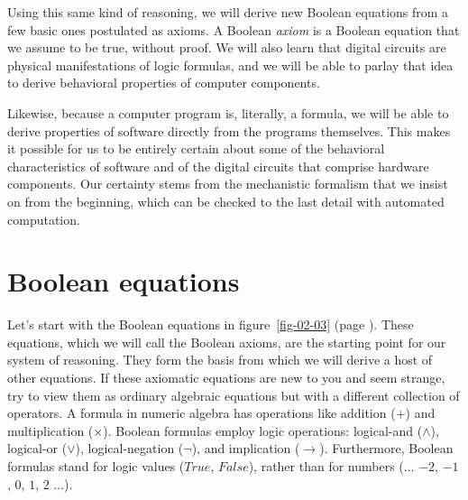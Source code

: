 Using this same kind of reasoning, we will derive new Boolean equations
from a few basic ones postulated as axioms.
A Boolean \emph{axiom} is a Boolean equation
that we assume to be true, without proof.
We will also learn that digital circuits are physical
manifestations of logic formulas, and we will be able to
parlay that idea to derive behavioral properties of
computer components.

Likewise, because a computer program is,
literally, a formula, we will be able to derive
properties of software directly from the programs themselves.
This makes it possible for us to be entirely
certain about some of the behavioral characteristics of
software and of the digital circuits that
comprise hardware components.
Our certainty stems from the mechanistic
formalism that we insist on from the beginning,
which can be checked to the last detail with automated computation.

\begin{exercises}
\label{ex:ch02-intro}


\end{exercises}

\section{Boolean equations}
\label{sec:boolean-equations}
Let's start with the Boolean equations in
figure~\ref{fig-02-03} (page \pageref{fig-02-03}).
These equations, which we will call the
Boolean axioms,
are the starting point for our system of reasoning.
They form the basis from which we will derive
a host of other equations.
If these axiomatic equations
are new to you and seem strange,
try to view them as ordinary
algebraic equations but with a different collection of operators.
A formula in numeric algebra has operations like addition
($+$) and multiplication ($\times$). Boolean formulas employ logic
operations: logical-and ($\wedge$), logical-or ($\vee$),
logical-negation ($\neg$), and implication ($\rightarrow$).
Furthermore, Boolean formulas stand for logic values
($True$, $False$), rather than for numbers ($\dots$ $-2$, $-1$, $0$, $1$, $2$ $\dots$).

